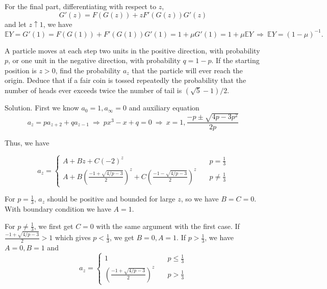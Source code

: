 For the final part, differentiating with respect to $z$,
\begin{equation}
G'(z) = F(G(z)) + zF'(G(z))G'(z)
\end{equation} 
and let $z\uparrow 1$, we have
\begin{equation}
\mathbb{E}Y = G'(1) = F(G(1)) + F'(G(1))G'(1) = 1+\mu G'(1) = 1+\mu\mathbb{E}Y \ \Rightarrow \ \mathbb{E}Y = (1-\mu)^{-1}.
\end{equation} 


\item A particle moves at each step two units in the positive direction, with probability $p$, or one unit in the negative direction, with probability $q=1-p$. If the starting position is $z>0$, find the probability $a_z$ that the particle will ever reach the origin. Deduce that if a fair coin is tossed repeatedly the probability that the number of heads ever exceeds twice the number of tail is $(\sqrt{5}-1)/2$.



Solution. First we know $a_0=1,a_\infty=0$ and auxiliary equation
\begin{equation}
a_z = pa_{z+2} + qa_{z-1} \ \Rightarrow \ px^3-x+q =0 \ \Rightarrow \ x=1,\frac{-p\pm\sqrt{4p-3p^2}}{2p}
\end{equation} 

Thus, we have

\begin{equation}
a_z = \left\{\begin{array}{ll}
A + Bz + C(-2)^z & \quad p=\frac 13 \\
A + B\left(\frac{-1+\sqrt{4/p-3}}{2}\right)^z + C\left(\frac{-1-\sqrt{4/p-3}}{2}\right)^z & \quad p\ne\frac 13
\end{array}\right.
\end{equation} 

For $p=\frac 13$, $a_z$ should be positive and bounded for large $z$, so we have $B=C=0$. With boundary condition we have $A=1$. 

For $p\ne \frac 13$, we first get $C=0$ with the same argument with the first case. If $\frac{-1+\sqrt{4/p-3}}{2}>1$ which gives $p<\frac 13$, we get $B=0,A=1$. If $p>\frac 13$, we have $A=0,B=1$ and 
\begin{equation}
a_z = \left\{\begin{array}{ll}
1 & \quad p\leq \frac 13 \\
\left(\frac{-1+\sqrt{4/p-3}}{2}\right)^z & \quad p>\frac 13
\end{array}\right.
\end{equation}

